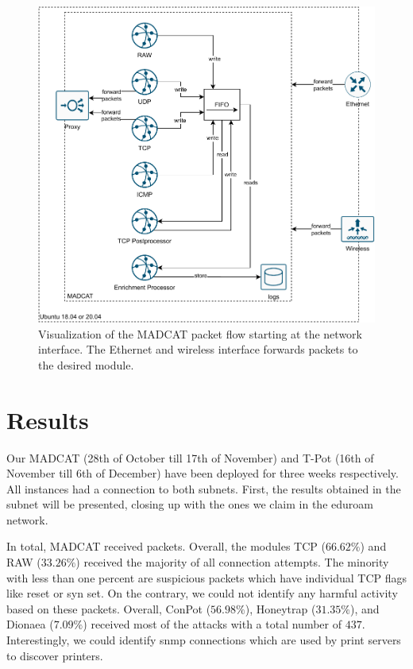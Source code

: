 \begin{figure}
    \centering
    \includegraphics[width=\textwidth]{figures/heicat-architecture.pdf}
    \caption[Visualization of the MADCAT packet flow]{Visualization of the MADCAT packet flow starting at the network interface. The Ethernet and wireless interface forwards packets to the desired module.}
    \label{fig:madcat-architecture}
\end{figure}

\section{Results}

Our MADCAT (28th of October till 17th of November) and T-Pot (16th of November till 6th of December) have been deployed for three weeks respectively.
All instances had a connection to both subnets.
First, the results obtained in the subnet  will be presented, closing up with the ones we claim in the eduroam network.

In total, MADCAT received  packets.
Overall, the modules TCP ($66.62\%$) and RAW ($33.26\%$) received the majority of all connection attempts.
The minority with less than one percent are suspicious packets which have individual TCP flags like reset or syn set. 
On the contrary, we could not identify any harmful activity based on these packets.
Overall, ConPot ($56.98\%$), Honeytrap ($31.35\%$), and Dionaea ($7.09\%$) received most of the attacks with a total number of $437$.
Interestingly, we could identify \ac{snmp} connections which are used by print servers to discover printers.

